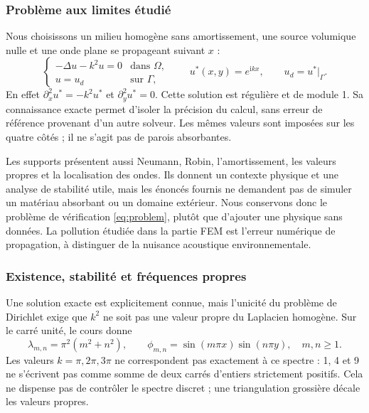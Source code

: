 \documentclass[12pt,a4paper]{article}
\newcommand{\ii}{\mathrm{i}}
\begin{document}
\subsubsection{Problème aux limites étudié}
Nous choisissons un milieu homogène sans amortissement, une source volumique nulle et une onde plane se propageant suivant $x$ :
\begin{equation}\label{eq:problem}
\begin{cases}
-\Delta u-k^2u=0 & \text{dans }\Omega,\\
u=u_d & \text{sur }\Gamma,
\end{cases}
\qquad u^*(x,y)=e^{\ii kx},\qquad u_d=u^*|_\Gamma.
\end{equation}
En effet $\partial_x^2u^*=-k^2u^*$ et $\partial_y^2u^*=0$. Cette solution est régulière et de module 1. Sa connaissance exacte permet d'isoler la précision du calcul, sans erreur de référence provenant d'un autre solveur. Les mêmes valeurs sont imposées sur les quatre côtés ; il ne s'agit pas de parois absorbantes.

Les supports présentent aussi Neumann, Robin, l'amortissement, les valeurs propres et la localisation des ondes. Ils donnent un contexte physique et une analyse de stabilité utile, mais les énoncés fournis ne demandent pas de simuler un matériau absorbant ou un domaine extérieur. Nous conservons donc le problème de vérification \eqref{eq:problem}, plutôt que d'ajouter une physique sans données. La pollution étudiée dans la partie FEM est l'erreur numérique de propagation, à distinguer de la nuisance acoustique environnementale.

\subsubsection{Existence, stabilité et fréquences propres}
Une solution exacte est explicitement connue, mais l'unicité du problème de Dirichlet exige que $k^2$ ne soit pas une valeur propre du Laplacien homogène. Sur le carré unité, le cours \cite{eigen} donne
\begin{equation*}
\lambda_{m,n}=\pi^2(m^2+n^2),\qquad
\phi_{m,n}=\sin(m\pi x)\sin(n\pi y),\quad m,n\geq1.
\end{equation*}
Les valeurs $k=\pi,2\pi,3\pi$ ne correspondent pas exactement à ce spectre : 1, 4 et 9 ne s'écrivent pas comme somme de deux carrés d'entiers strictement positifs. Cela ne dispense pas de contrôler le spectre discret ; une triangulation grossière décale les valeurs propres.
\end{document}
